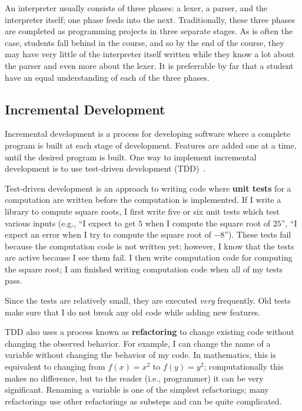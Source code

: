 \documentclass{article}
\newcommand{\term}[1]{\textbf{#1}}
\begin{document}
An interpreter usually consists of three phases: a lexer, a parser, and the interpreter itself; one phase feeds into the next.  Traditionally, these three phases are completed as programming projects in three separate stages.  As is often the case, students fall behind in the course, and so by the end of the course, they may have very little of the interpreter itself written while they know a lot about the parser and even more about the lexer.  It is preferrable by far that a student have an equal understanding of each of the three phases.

\subsection*{Incremental Development}

Incremental development is a process for developing software where a complete program is built at each stage of development.  Features are added one at a time, until the desired program is built.  One way to implement incremental development is to use test-driven development (TDD)~\cite{tdd}.

Test-driven development is an approach to writing code where \term{unit tests} for a computation are written before the computation is implemented.  If I write a library to compute square roots, I first write five or six unit tests which test various inputs (e.g., ``I expect to get $5$ when I compute the square root of $25$'', ``I expect an error when I try to compute the square root of $-8$'').  These tests fail because the computation code is not written yet; however, I know that the tests are active because I see them fail.  I then write computation code for computing the square root; I am finished writing computation code when all of my tests pass.

Since the tests are relatively small, they are executed \emph{very} frequently.  Old tests make sure that I do not break any old code while adding new features.

TDD also uses a process known as \term{refactoring} to change existing code without changing the observed behavior.  For example, I can change the name of a variable without changing the behavior of my code.  In mathematics, this is equivalent to changing from $f(x)=x^2$ to $f(y)=y^2$; computationally this makes no difference, but to the reader (i.e., programmer) it can be very significant.  Renaming a variable is one of the simplest refactorings; many refactorings use other refactorings as substeps and can be quite complicated.
\end{document}
